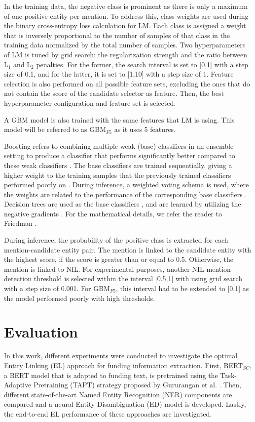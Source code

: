 \documentclass{report}
\theoremstyle{definition}
\theoremstyle{remark}
\begin{document}
In the training data, the negative class is prominent as there is only a maximum of one positive entity per mention. To address this, class weights are used during the binary cross-entropy loss calculation for LM. Each class is assigned a weight that is inversely proportional to the number of samples of that class in the training data normalized by the total number of samples. Two hyperparameters of LM is tuned by grid search: the regularization strength and the ratio between L$_1$ and L$_2$ penalties. For the former, the search interval is set to [0,1] with a step size of 0.1, and for the latter, it is set to [1,10] with a step size of 1. Feature selection is also performed on all possible feature sets, excluding the ones that do not contain the score of the candidate selector as feature. Then, the best hyperparameter configuration and feature set is selected.

A GBM model is also trained with the same features that LM is using. This model will be referred to as GBM$_{F5}$ as it uses 5 features. 

Boosting refers to combining multiple weak (base) classifiers in an ensemble setting to produce a classifier that performs significantly better compared to these weak classifiers \cite{bishop}. The base classifiers are trained sequentially, giving a higher weight to the training samples that the previously trained classifiers performed poorly on \cite{bishop}. During inference, a weighted voting schema is used, where the weights are related to the performance of the corresponding base classifiers \cite{bishop}. Decision trees \cite{decisiontree} are used as the base classifiers \cite{GBM}, and are learned by utilizing the negative gradients \cite{lightgbmlib}.  For the mathematical details, we refer the reader to Friedman \cite{GBM}.

During inference, the probability of the positive class is extracted for each mention-candidate entity pair. The mention is linked to the candidate entity with the highest score, if the score is greater than or equal to 0.5. Otherwise, the mention is linked to NIL. For experimental purposes, another NIL-mention detection threshold is selected within the interval [0.5,1] with using grid search with a step size of 0.001. For GBM$_{F5}$, this interval had to be extended to [0,1] as the model performed poorly with high thresholds.

\newpage
\chapter{Evaluation}
\label{sec:Evaluation}
In this work, different experiments were conducted to investigate the optimal Entity Linking (EL) approach for funding information extraction. First, BERT$_{SC}$, a BERT model that is adapted to funding text, is pretrained using the Task-Adaptive Pretraining (TAPT) strategy proposed by Gururangan et al. \cite{DontStop}. Then, different state-of-the-art Named Entity Recognition (NER) components are compared and a neural Entity Disambiguation (ED) model is developed. Lastly, the end-to-end EL performance of these approaches are investigated.
\end{document}
